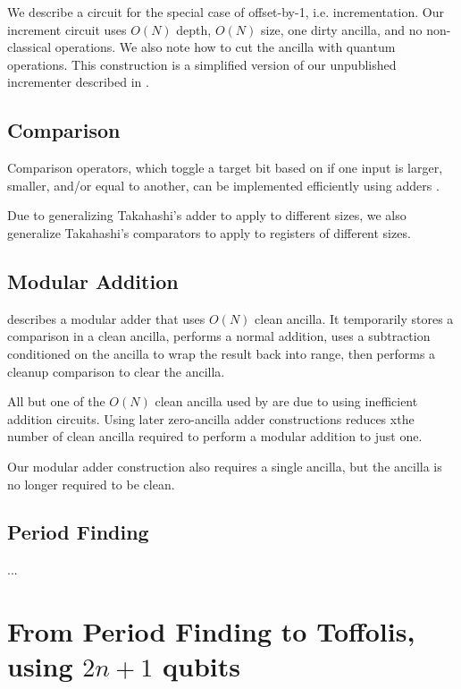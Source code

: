 \documentclass[twocolumn]{article}
\begin{document}
We describe a circuit for the special case of offset-by-1, i.e. incrementation.
Our increment circuit uses $O(N)$ depth, $O(N)$ size, one dirty ancilla, and no non-classical operations.
We also note how to cut the ancilla with quantum operations.
This construction is a simplified version of our unpublished incrementer described in \cite{gidney2015}.

\subsection{Comparison}

Comparison operators, which toggle a target bit based on if one input is larger, smaller, and/or equal to another, can be implemented efficiently using adders \cite{takahashi2005}.

Due to generalizing Takahashi's adder \cite{takahashi2005} to apply to different sizes, we also generalize Takahashi's comparators to apply to registers of different sizes.

\subsection{Modular Addition}

\cite{vedral1995} describes a modular adder that uses $O(N)$ clean ancilla.
It temporarily stores a comparison in a clean ancilla, performs a normal addition, uses a subtraction conditioned on the ancilla to wrap the result back into range, then performs a cleanup comparison to clear the ancilla.

All but one of the $O(N)$ clean ancilla used by \cite{vedral1995} are due to using inefficient addition circuits.
Using later zero-ancilla adder constructions reduces xthe number of clean ancilla required to perform a modular addition to just one.

Our modular adder construction also requires a single ancilla, but the ancilla is no longer required to be clean.

\subsection{Period Finding}

...








\section{From Period Finding to Toffolis, using $2n+1$ qubits} \label{sec:first-circuit} \label{sec:construct}
\end{document}
